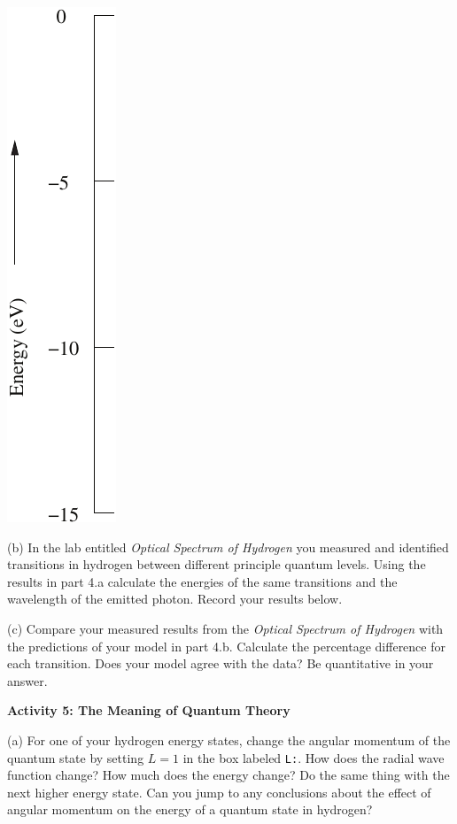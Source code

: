 \hspace{1.0cm}\includegraphics{solveSE/energyLevels.pdf}

\answerspace{0.75in}

\newpage

(b) In the lab entitled {\it Optical Spectrum of Hydrogen}
you measured and identified transitions in hydrogen between different
principle quantum levels.
Using the results in part 4.a calculate the energies of the 
same transitions and the wavelength of the emitted photon.
Record your results below.
\answerspace{4.0cm}

(c) Compare your measured results from the {\it Optical Spectrum of Hydrogen}
with the predictions of your model in part 4.b.
Calculate the percentage difference for each transition.
Does your model agree with the data?
Be quantitative in your answer.
\answerspace{3.0cm}


\textbf{Activity 5: The Meaning of Quantum Theory}

(a) For one of your hydrogen energy states, change the angular momentum of the
quantum state by setting $L=1$ in the box labeled {\tt L:}.
How does the radial wave function change?
How much does the energy change?
Do the same thing with the next higher energy state.
Can you jump to any conclusions about the effect of angular momentum on the energy
of a quantum state in hydrogen?
\answerspace{2.0cm}

